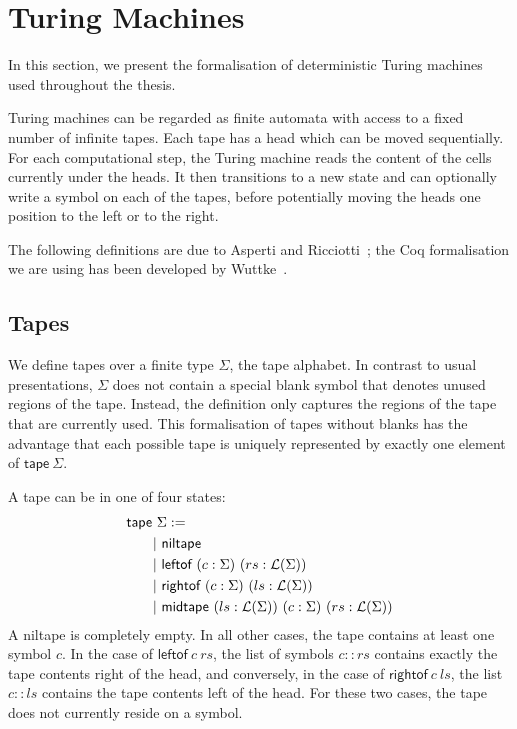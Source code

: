 \section{Turing Machines}
In this section, we present the formalisation of deterministic Turing machines used throughout the thesis. 

Turing machines can be regarded as finite automata with access to a fixed number of infinite tapes. Each tape has a head which can be moved sequentially. 
For each computational step, the Turing machine reads the content of the cells currently under the heads. It then transitions to a new state and can optionally write a symbol on each of the tapes, before potentially moving the heads one position to the left or to the right.

The following definitions are due to Asperti and Ricciotti~\cite{asperti_ricciotti}; the Coq formalisation we are using has been developed by Wuttke~\cite{wuttke2017}.

\subsection{Tapes}
We define tapes over a finite type $\Sigma$, the tape alphabet. In contrast to usual presentations, $\Sigma$ does not contain a special blank symbol that denotes unused regions of the tape. Instead, the definition only captures the regions of the tape that are currently used. 
This formalisation of tapes without blanks has the advantage that each possible tape is uniquely represented by exactly one element of $\textsf{tape}~\Sigma$. 

A tape can be in one of four states:
\begin{align*}
  \textsf{tape}~&\Sigma  := \\
  |&~\textsf{niltape} \\
  |&~\textsf{leftof}~(c : \Sigma)~(rs : \mathcal{L} (\Sigma)) \\
  |&~\textsf{rightof}~(c : \Sigma)~(ls : \mathcal{L} (\Sigma)) \\
  |&~\textsf{midtape}~(ls : \mathcal{L} (\Sigma))~(c : \Sigma)~(rs : \mathcal{L} (\Sigma))
\end{align*}
A \textsf{niltape} is completely empty. In all other cases, the tape contains at least one symbol $c$. 
In the case of $\textsf{leftof}~c~rs$, the list of symbols $c::rs$ contains exactly the tape contents right of the head, and conversely, in the case of $\textsf{rightof}~c~ls$, the list $c::ls$ contains the tape contents left of the head. For these two cases, the tape does not currently reside on a symbol.

